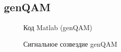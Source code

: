 \documentclass[12pt,a4paper]{scrartcl}
\begin{document}
\subsection{genQAM}
\label{sec:genQAM}
\begin{figure}[h!]
\caption{Код Matlab (genQAM)}
\end{figure}

\begin{figure}[h!]
\caption{Сигнальное созвездие genQAM}
\end{figure}

\clearpage
\newpage
\end{document}
